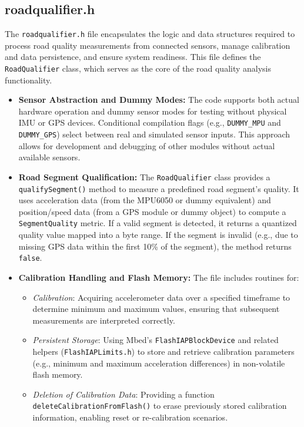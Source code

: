 \subsection{roadqualifier.h}

The \texttt{roadqualifier.h} file encapsulates the logic and data structures required to process road quality measurements from connected sensors, manage calibration and data persistence, and ensure system readiness. This file defines the \texttt{RoadQualifier} class, which serves as the core of the road quality analysis functionality.

\begin{itemize}
    \item \textbf{Sensor Abstraction and Dummy Modes:}  
    The code supports both actual hardware operation and dummy sensor modes for testing without physical IMU or GPS devices. Conditional compilation flags (e.g., \texttt{DUMMY\_MPU} and \texttt{DUMMY\_GPS}) select between real and simulated sensor inputs. This approach allows for development and debugging of other modules without actual available sensors.

    \item \textbf{Road Segment Qualification:}  
    The \texttt{RoadQualifier} class provides a \texttt{qualifySegment()} method to measure a predefined road segment’s quality. It uses acceleration data (from the MPU6050 or dummy equivalent) and position/speed data (from a GPS module or dummy object) to compute a \texttt{SegmentQuality} metric. If a valid segment is detected, it returns a quantized quality value mapped into a byte range. If the segment is invalid (e.g., due to missing GPS data within the first 10\% of the segment), the method returns \texttt{false}.

    \item \textbf{Calibration Handling and Flash Memory:}  
    The file includes routines for:
    \begin{itemize}
        \item \textit{Calibration}: Acquiring accelerometer data over a specified timeframe to determine minimum and maximum values, ensuring that subsequent measurements are interpreted correctly.
        \item \textit{Persistent Storage}: Using Mbed’s \texttt{FlashIAPBlockDevice} and related helpers (\texttt{FlashIAPLimits.h}) to store and retrieve calibration parameters (e.g., minimum and maximum acceleration differences) in non-volatile flash memory.
        \item \textit{Deletion of Calibration Data}: Providing a function \texttt{deleteCalibrationFromFlash()} to erase previously stored calibration information, enabling reset or re-calibration scenarios.
    \end{itemize}


\end{itemize}

